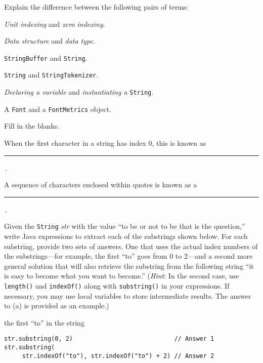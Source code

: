 \label{exercises}
\begin{EXRtwo}

\item  Explain the difference between the following pairs of terms:
\begin{EXRtwoLL}
\item  {\it Unit indexing} and {\it zero indexing}.
\item  {\it Data structure} and {\it data type}.
\item  {\tt StringBuffer} and {\tt String}.
\item  {\tt String} and {\tt StringTokenizer}.
\item  {\it Declaring a variable} and {\it instantiating a} {\tt String}.
\item  A {\tt Font} and a {\tt FontMetrics} object.
\end{EXRtwoLL}

\item  Fill in the blanks.

\begin{EXRtwoLL}\baselineskip=14pt
\item  When the first character in a string has index 0, this is known as \rule{40pt}{0.5pt}\,.
\item  A sequence of characters enclosed within quotes is known as a \rule{40pt}{0.5pt}\,.
\end{EXRtwoLL}\baselineskip=11pt

\item Given the {\tt String} {\it str} with the value ``to be or not
to be that is the question,'' write Java expressions to extract each
of the substrings shown below.  For each substring, provide two sets
of answers.  One that uses the actual index numbers of the
substrings---for example, the first ``to'' goes from 0 to 2---and a
second more general solution that will also retrieve the 
substring from the following string ``it is easy to become what you
want to become.''  ({\it Hint}: In the second case, use {\tt length()}
and {\tt indexOf()} along with {\tt substring()} in your expressions.
If necessary, you may use local variables to store intermediate
results.  The answer to (a) is provided as an example.)

\begin{EXRtwoLL}
\item  the first ``to'' in the string
\begin{jjjlisting}
\begin{lstlisting}
str.substring(0, 2)                            // Answer 1
str.substring(
     str.indexOf("to"), str.indexOf("to") + 2) // Answer 2
\end{lstlisting}
\end{jjjlisting}


\end{EXRtwoLL}
\end{EXRtwo}
